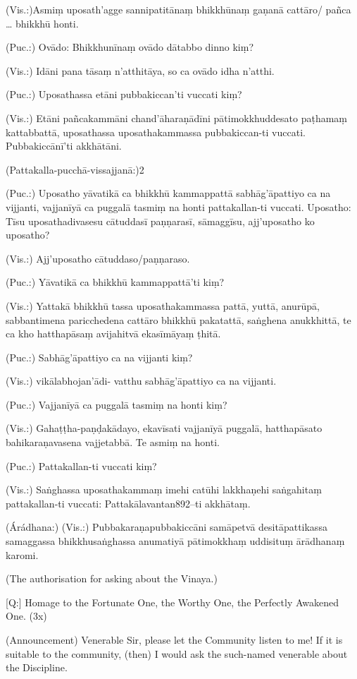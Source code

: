 (Vis.:)Asmiṃ uposath'agge sannipatitānaṃ bhikkhūnaṃ gaṇanā cattāro/
pañca … bhikkhū honti.

(Puc.:) Ovādo: Bhikkhunīnaṃ ovādo dātabbo dinno kiṃ?

(Vis.:) Idāni pana tāsaṃ n’atthitāya, so ca ovādo idha n’atthi.

(Puc.:) Uposathassa etāni pubbakiccan’ti vuccati kiṃ?

(Vis.:) Etāni pañcakammāni chand'āharaṇādīni pātimokkhuddesato
paṭhamaṃ kattabbattā, uposathassa uposathakammassa pubbakiccan-ti
vuccati. Pubbakiccānī'ti akkhātāni.

(Pattakalla-pucchā-vissajjanā:)2

(Puc.:) Uposatho yāvatikā ca bhikkhū kammappattā sabhāg'āpattiyo ca na
vijjanti, vajjanīyā ca puggalā tasmiṃ na honti pattakallan-ti vuccati.
Uposatho: Tīsu uposathadivasesu cātuddasī paṇṇarasī, sāmaggīsu,
ajj’uposatho ko uposatho?

(Vis.:) Ajj’uposatho cātuddaso/paṇṇaraso.

(Puc.:) Yāvatikā ca bhikkhū kammappattā'ti kiṃ?

(Vis.:) Yattakā bhikkhū tassa uposathakammassa pattā, yuttā, anurūpā,
sabbantimena paricchedena cattāro bhikkhū pakatattā, saṅghena
anukkhittā, te ca kho hatthapāsaṃ avijahitvā ekasīmāyaṃ ṭhitā.

(Puc.:) Sabhāg'āpattiyo ca na vijjanti kiṃ?

(Vis.:) vikālabhojan'ādi- vatthu sabhāg'āpattiyo ca na vijjanti.

(Puc.:) Vajjanīyā ca puggalā tasmiṃ na honti kiṃ?

(Vis.:) Gahaṭṭha-paṇḍakādayo, ekavīsati vajjanīyā puggalā, hatthapāsato
bahikaraṇavasena vajjetabbā. Te asmiṃ na honti.

(Puc.:) Pattakallan-ti vuccati kiṃ?

(Vis.:) Saṅghassa uposathakammaṃ imehi catūhi lakkhaṇehi saṅgahitaṃ
pattakallan-ti vuccati: Pattakālavantan892–ti akkhātaṃ.

(Árádhana:)
(Vis.:) Pubbakaraṇapubbakiccāni samāpetvā desitāpattikassa samaggassa
bhikkhusaṅghassa anumatiyā pātimokkhaṃ uddisituṃ ārādhanaṃ
karomi.

\clearpage

(The authorisation for asking about the Vinaya.)

[Q:] Homage to the Fortunate One, the Worthy One, the Perfectly
Awakened One. (3x)

(Announcement)
Venerable Sir, please let the Community listen to me! If it is suitable
to the community, (then) I would ask the such-named venerable
about the Discipline.

